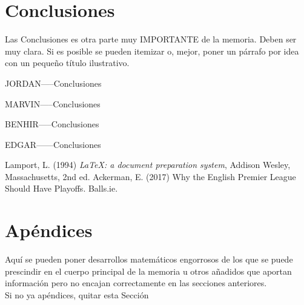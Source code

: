 \documentclass[11pt,a4paper,spanish]{book}
\begin{document}
\chapter{Conclusiones}

Las Conclusiones es otra parte muy IMPORTANTE de la memoria. Deben ser muy clara. Si es posible se pueden itemizar o, mejor, poner un párrafo por idea con un pequeño título ilustrativo.

JORDAN-----Conclusiones

MARVIN-----Conclusiones

BENHIR-----Conclusiones

EDGAR------Conclusiones



\begin{thebibliography}{a}
 Lamport, L. (1994) \emph{\LaTeX: a document preparation system}, Addison
Wesley, Massachusetts, 2nd ed.
 Ackerman, E. (2017) Why the English Premier League Should Have Playoffs.  Balls.ie. 
\end{thebibliography}
% 
%


\appendix
\chapter{Apéndices}

Aquí se pueden poner desarrollos matemáticos engorrosos de los que se puede prescindir en el cuerpo principal de la memoria u otros añadidos que aportan información pero no encajan correctamente en las secciones anteriores.\\

Si no ya apéndices, quitar esta Sección
\end{document}

